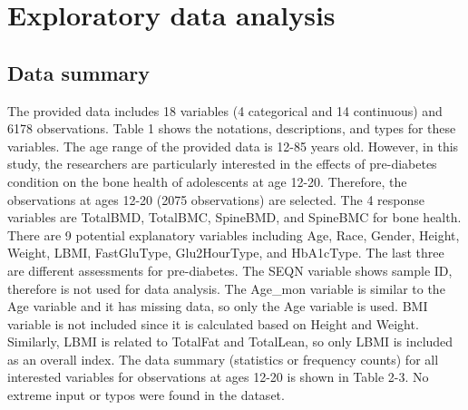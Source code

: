 \documentclass[11pt]{article}
\begin{document}
\section{Exploratory data analysis}
\subsection{Data summary}
The provided data includes 18 variables (4 categorical and 14 continuous) and 6178 observations. Table 1 shows the notations, descriptions, and types for these variables. The age range of the provided data is 12-85 years old. However, in this study, the researchers are particularly interested in the effects of pre-diabetes condition on the bone health of adolescents at age 12-20. Therefore, the observations at ages 12-20 (2075 observations) are selected. The 4 response variables are TotalBMD, TotalBMC, SpineBMD, and SpineBMC for bone health. There are 9 potential explanatory variables including Age, Race, Gender, Height, Weight, LBMI, FastGluType, Glu2HourType, and HbA1cType. The last three are different assessments for pre-diabetes. The SEQN variable shows sample ID, therefore is not used for data analysis. The Age\_mon variable is similar to the Age variable and it has missing data, so only the Age variable is used. BMI variable is not included since it is calculated based on Height and Weight. Similarly, LBMI is related to TotalFat and TotalLean, so only LBMI is included as an overall index. The data summary (statistics or frequency counts) for all interested variables for observations at ages 12-20 is shown in Table 2-3. No extreme input or typos were found in the dataset.
\end{document}
